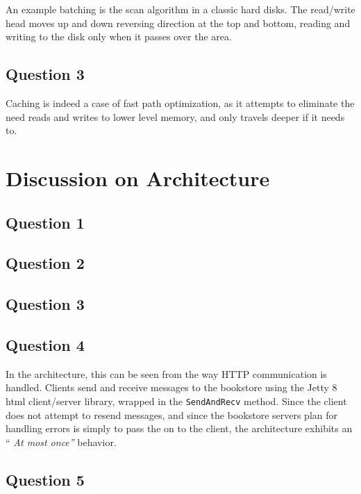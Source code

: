 \documentclass[10pt,a4paper]{article}
\begin{document}
An example batching is the scan algorithm in a classic hard disks. The read/write head moves up and down reversing direction at the top and bottom, reading and writing to the disk only when it passes over the area.

\subsection{Question 3}

Caching is indeed a case of fast path optimization, as it attempts to eliminate the need reads and writes to lower level memory, and only travels deeper if it needs to.


\section{Discussion on Architecture}

\subsection{Question 1}

\subsection{Question 2}

\subsection{Question 3}

\subsection{Question 4}

In the architecture, this can be seen from the way HTTP communication is handled. Clients send and receive messages to the bookstore using the Jetty 8 html client/server library, wrapped in the {\tt SendAndRecv} method. Since the client does not attempt to resend messages, and since the bookstore servers plan for handling errors is simply to pass the on to the client, the architecture exhibits an {`` \it At most once''} behavior.

\subsection{Question 5}
\end{document}
